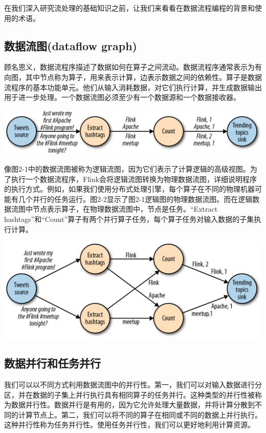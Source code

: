 \documentclass[oneside]{ctexbook}
\begin{document}
在我们深入研究流处理的基础知识之前，让我们来看看在数据流程编程的背景和使用的术语。

\subsection{数据流图(dataflow graph)}

顾名思义，数据流程序描述了数据如何在算子之间流动。数据流程序通常表示为有向图，其中节点称为算子，用来表示计算，边表示数据之间的依赖性。算子是数据流程序的基本功能单元。他们从输入消耗数据，对它们执行计算，并生成数据输出用于进一步处理。一个数据流图必须至少有一个数据源和一个数据接收器。

\noindent\includegraphics[width=\textwidth]{spaf_0201.png}

像图2-1中的数据流图被称为逻辑流图，因为它们表示了计算逻辑的高级视图。为了执行一个数据流程序，Flink会将逻辑流图转换为物理数据流图，详细说明程序的执行方式。例如，如果我们使用分布式处理引擎，每个算子在不同的物理机器可能有几个并行的任务运行。图2-2显示了图2-1逻辑图的物理数据流图。而在逻辑数据流图中节点表示算子，在物理数据流图中，节点是任务。“Extract hashtags”和“Count”算子有两个并行算子任务，每个算子任务对输入数据的子集执行计算。

\noindent\includegraphics[width=\textwidth]{spaf_0202.png}

\subsection{数据并行和任务并行}

我们可以以不同方式利用数据流图中的并行性。第一，我们可以对输入数据进行分区，并在数据的子集上并行执行具有相同算子的任务并行。这种类型的并行性被称为数据并行性。数据并行是有用的，因为它允许处理大量数据，并将计算分散到不同的计算节点上。第二，我们可以将不同的算子在相同或不同的数据上并行执行。这种并行性称为任务并行性。使用任务并行性，我们可以更好地利用计算资源。
\end{document}
